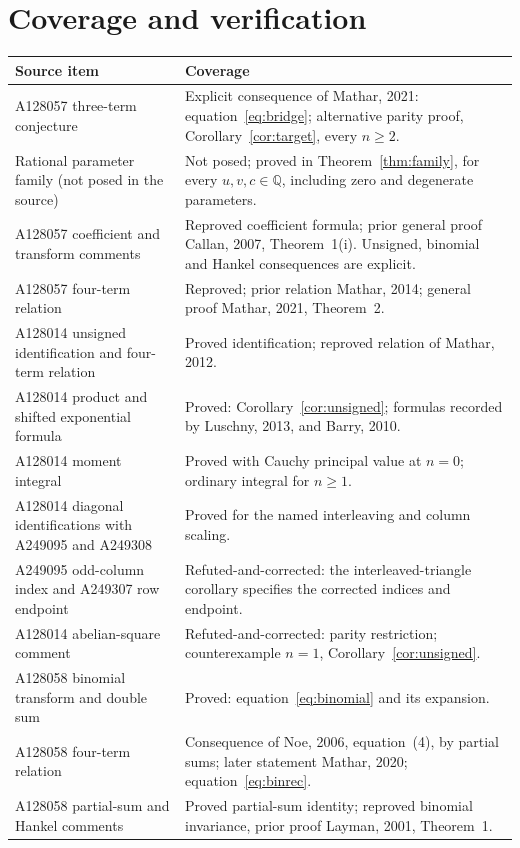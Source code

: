 \documentclass[11pt]{article}
\newcommand{\Q}{\mathbb{Q}}
\begin{document}
\section{Coverage and verification}
\small
\begin{longtable}{@{}>{\raggedright\arraybackslash}p{}>{\raggedright\arraybackslash}p{}@{}}
\toprule
Source item & Coverage \\
\midrule
\endhead
A128057 three-term conjecture & Explicit consequence of Mathar, 2021: equation~\eqref{eq:bridge}; alternative parity proof, Corollary~\ref{cor:target}, every $n\geq2$. \\
Rational parameter family (not posed in the source) & Not posed; proved in Theorem~\ref{thm:family}, for every $u,v,c\in\Q$, including zero and degenerate parameters. \\
A128057 coefficient and transform comments & Reproved coefficient formula; prior general proof Callan, 2007, Theorem~1(i). Unsigned, binomial and Hankel consequences are explicit. \\
A128057 four-term relation & Reproved; prior relation Mathar, 2014; general proof Mathar, 2021, Theorem~2. \\
A128014 unsigned identification and four-term relation & Proved identification; reproved relation of Mathar, 2012. \\
A128014 product and shifted exponential formula & Proved: Corollary~\ref{cor:unsigned}; formulas recorded by Luschny, 2013, and Barry, 2010. \\
A128014 moment integral & Proved with Cauchy principal value at $n=0$; ordinary integral for $n\geq1$. \\
A128014 diagonal identifications with A249095 and A249308 & Proved for the named interleaving and column scaling. \\
A249095 odd-column index and A249307 row endpoint & Refuted-and-corrected: the interleaved-triangle corollary specifies the corrected indices and endpoint. \\
A128014 abelian-square comment & Refuted-and-corrected: parity restriction; counterexample $n=1$, Corollary~\ref{cor:unsigned}. \\
A128058 binomial transform and double sum & Proved: equation~\eqref{eq:binomial} and its expansion. \\
A128058 four-term relation & Consequence of Noe, 2006, equation~(4), by partial sums; later statement Mathar, 2020; equation~\eqref{eq:binrec}. \\
A128058 partial-sum and Hankel comments & Proved partial-sum identity; reproved binomial invariance, prior proof Layman, 2001, Theorem~1. \\

\end{longtable}
\end{document}
